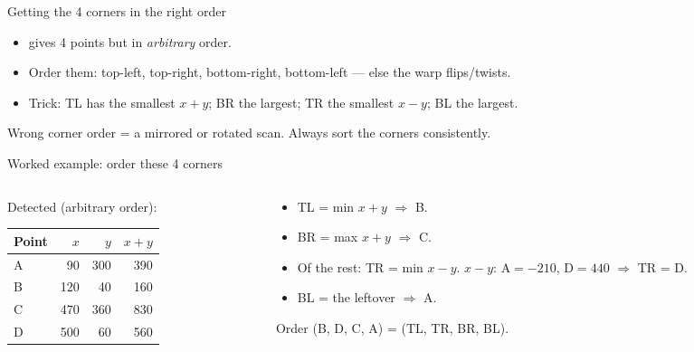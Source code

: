 \documentclass[10pt,aspectratio=169]{beamer}
\begin{document}
\begin{frame}{Getting the 4 corners in the right order}
  \begin{itemize}
    \item {} gives 4 points but in \emph{arbitrary} order.
    \item Order them: top-left, top-right, bottom-right, bottom-left — else the warp flips/twists.
    \item Trick: TL has the smallest $x{+}y$; BR the largest; TR the smallest $x{-}y$; BL the largest.
  \end{itemize}
  \begin{badbox}
    Wrong corner order = a mirrored or rotated scan. Always sort the corners consistently.
  \end{badbox}
\end{frame}

\begin{frame}{Worked example: order these 4 corners}
  \begin{columns}[T]
    \begin{column}{0.52\textwidth}
      Detected (arbitrary order):
      \begin{center}
      \begin{tabular}{@{}lrrr@{}}
        \toprule
        Point & $x$ & $y$ & $x{+}y$ \\
        \midrule
        A & 90 & 300 & 390 \\
        B & 120 & 40 & 160 \\
        C & 470 & 360 & 830 \\
        D & 500 & 60 & 560 \\
        \bottomrule
      \end{tabular}
      \end{center}
    \end{column}
    \begin{column}{0.48\textwidth}
      \begin{itemize}
        \item TL = min $x{+}y$ $\Rightarrow$ B.
        \item BR = max $x{+}y$ $\Rightarrow$ C.
        \item Of the rest: TR = min $x{-}y$. $x{-}y$: A$=-210$, D$=440$ $\Rightarrow$ TR = D.
        \item BL = the leftover $\Rightarrow$ A.
      \end{itemize}
      \begin{goodbox}
        Order (B, D, C, A) = (TL, TR, BR, BL).
      \end{goodbox}
    \end{column}
  \end{columns}
\end{frame}
\end{document}
